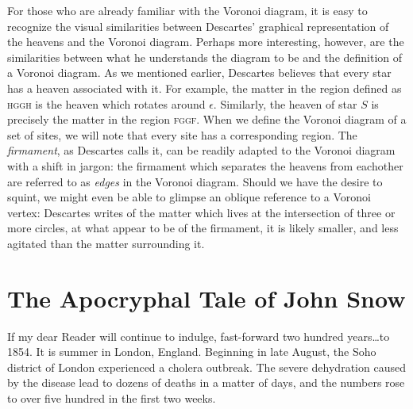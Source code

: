 \documentclass[12pt,twoside]{reedthesis}
\begin{document}
   For those who are already familiar with the Voronoi diagram, it is easy to recognize the visual similarities between Descartes' graphical representation of the heavens and the Voronoi diagram. Perhaps more interesting, however, are the similarities between what he understands the diagram to be and the definition of a Voronoi diagram. As we mentioned earlier, Descartes believes that every star has a heaven associated with it. For example, the matter in the region defined as \textsc{hggh} is the heaven which rotates around $\epsilon$. Similarly, the heaven of star $S$ is precisely the matter in the region \textsc{fggf}. When we define the Voronoi diagram of a set of sites, we will note that every site has a corresponding region. The \emph{firmament}, as Descartes calls it, can be readily adapted to the Voronoi diagram with a shift in jargon: the firmament which separates the heavens from eachother are referred to as \emph{edges} in the Voronoi diagram. Should we have the desire to squint, we might even be able to glimpse an oblique reference to a Voronoi vertex: Descartes writes of the matter which lives at the intersection of three or more circles, at what appear to be  of the firmament, it is likely smaller, and less agitated than the matter surrounding it.  
  
  \section{The Apocryphal Tale of John Snow} %
  \label{sec:the_apocryphal_tale_of_john_snow}
    If my dear Reader will continue to indulge, fast-forward two hundred years\ldots to 1854. It is summer in London, England. Beginning in late August, the Soho district of London experienced a cholera outbreak. The severe dehydration caused by the disease lead to dozens of deaths in a matter of days, and the numbers rose to over five hundred in the first two weeks. 
\end{document}
